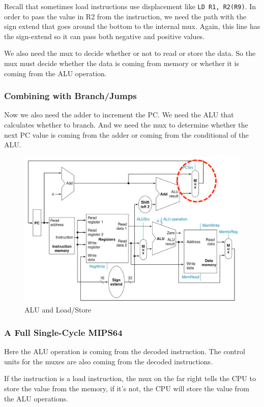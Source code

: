 \documentclass{article}
\begin{document}
Recall that sometimes load instructions use displacement like \texttt{LD R1, R2(R9)}. In order to pass the value in R2 from the instruction, we need the path with the sign extend that goes around the bottom to the internal mux. Again, this line has the sign-extend so it can pass both negative and positive values.

We also need the mux to decide whether or not to read or store the data. So the mux must decide whether the data is coming from memory or whether it is coming from the ALU operation.

\subsubsection{Combining with Branch/Jumps}

Now we also need the adder to increment the PC. We need the ALU that calculates whether to branch. And we need the mux to determine whether the next PC value is coming from the adder or coming from the conditional of the ALU. 

\begin{figure}[ht!]
\centering
\includegraphics[width=120mm]{img/WithBranchJumps.png}
\caption{ALU and Load/Store}
\end{figure}

\subsubsection{A Full Single-Cycle MIPS64}

Here the ALU operation is coming from the decoded instruction. The control units for the muxes are also coming from the decoded instructions. 

If the instruction is a load instruction, the mux on the far right tells the CPU to store the value from the memory, if it's not, the CPU will store the value from the ALU operations.
\end{document}
